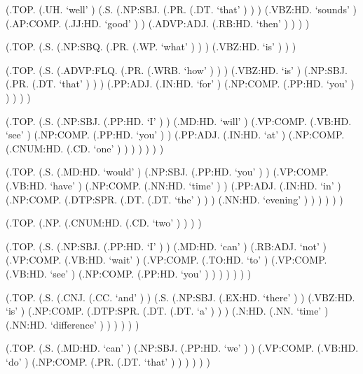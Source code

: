 \documentclass[10pt]{article}
\begin{document}
\begin{parsetree}  (.TOP. (.UH. `well' ) (.S. (.NP:SBJ. (.PR. (.DT. `that' ) ) ) (.VBZ:HD. `sounds' ) (.AP:COMP. (.JJ:HD. `good' ) ) (.ADVP:ADJ. (.RB:HD. `then' ) ) ) ) \end{parsetree}

\begin{parsetree}  (.TOP. (.S. (.NP:SBQ. (.PR. (.WP. `what' ) ) ) (.VBZ:HD. `is' ) ) ) \end{parsetree}

\begin{parsetree}  (.TOP. (.S. (.ADVP:FLQ. (.PR. (.WRB. `how' ) ) ) (.VBZ:HD. `is' ) (.NP:SBJ. (.PR. (.DT. `that' ) ) ) (.PP:ADJ. (.IN:HD. `for' ) (.NP:COMP. (.PP:HD. `you' ) ) ) ) ) \end{parsetree}

\begin{parsetree}  (.TOP. (.S. (.NP:SBJ. (.PP:HD. `I' ) ) (.MD:HD. `will' ) (.VP:COMP. (.VB:HD. `see' ) (.NP:COMP. (.PP:HD. `you' ) ) (.PP:ADJ. (.IN:HD. `at' ) (.NP:COMP. (.CNUM:HD. (.CD. `one' ) ) ) ) ) ) ) \end{parsetree}

\begin{parsetree}  (.TOP. (.S. (.MD:HD. `would' ) (.NP:SBJ. (.PP:HD. `you' ) ) (.VP:COMP. (.VB:HD. `have' ) (.NP:COMP. (.NN:HD. `time' ) ) (.PP:ADJ. (.IN:HD. `in' ) (.NP:COMP. (.DTP:SPR. (.DT. (.DT. `the' ) ) ) (.NN:HD. `evening' ) ) ) ) ) ) \end{parsetree}

\begin{parsetree}  (.TOP. (.NP. (.CNUM:HD. (.CD. `two' ) ) ) ) \end{parsetree}

\begin{parsetree}  (.TOP. (.S. (.NP:SBJ. (.PP:HD. `I' ) ) (.MD:HD. `can' ) (.RB:ADJ. `not' ) (.VP:COMP. (.VB:HD. `wait' ) (.VP:COMP. (.TO:HD. `to' ) (.VP:COMP. (.VB:HD. `see' ) (.NP:COMP. (.PP:HD. `you' ) ) ) ) ) ) ) \end{parsetree}

\begin{parsetree}  (.TOP. (.S. (.CNJ. (.CC. `and' ) ) (.S. (.NP:SBJ. (.EX:HD. `there' ) ) (.VBZ:HD. `is' ) (.NP:COMP. (.DTP:SPR. (.DT. (.DT. `a' ) ) ) (.N:HD. (.NN. `time' ) (.NN:HD. `difference' ) ) ) ) ) ) \end{parsetree}

\begin{parsetree}  (.TOP. (.S. (.MD:HD. `can' ) (.NP:SBJ. (.PP:HD. `we' ) ) (.VP:COMP. (.VB:HD. `do' ) (.NP:COMP. (.PR. (.DT. `that' ) ) ) ) ) ) \end{parsetree}
\end{document}
